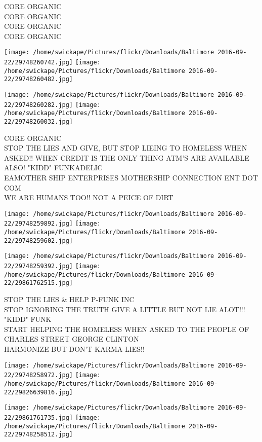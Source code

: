 \documentclass[10pt,letterpaper]{article}
\begin{document}
CORE ORGANIC\\
CORE ORGANIC\\
CORE ORGANIC\\
CORE ORGANIC
\pagebreak

\texttt{[image: /home/swickape/Pictures/flickr/Downloads/Baltimore 2016-09-22/29748260742.jpg]}
\texttt{[image: /home/swickape/Pictures/flickr/Downloads/Baltimore 2016-09-22/29748260482.jpg]}

\texttt{[image: /home/swickape/Pictures/flickr/Downloads/Baltimore 2016-09-22/29748260282.jpg]}
\texttt{[image: /home/swickape/Pictures/flickr/Downloads/Baltimore 2016-09-22/29748260032.jpg]}

CORE ORGANIC\\
STOP THE LIES AND GIVE, BUT STOP LIEING TO HOMELESS WHEN ASKED!! WHEN CREDIT IS THE ONLY THING ATM'S ARE AVAILABLE ALSO! "KIDD" FUNKADELIC\\
EAMOTHER SHIP ENTERPRISES MOTHERSHIP CONNECTION ENT DOT COM\\
WE ARE HUMANS TOO!! NOT A PEICE OF DIRT
\pagebreak

\texttt{[image: /home/swickape/Pictures/flickr/Downloads/Baltimore 2016-09-22/29748259892.jpg]}
\texttt{[image: /home/swickape/Pictures/flickr/Downloads/Baltimore 2016-09-22/29748259602.jpg]}

\texttt{[image: /home/swickape/Pictures/flickr/Downloads/Baltimore 2016-09-22/29748259392.jpg]}
\texttt{[image: /home/swickape/Pictures/flickr/Downloads/Baltimore 2016-09-22/29861762515.jpg]}

STOP THE LIES \& HELP P{-}FUNK INC\\
STOP IGNORING THE TRUTH GIVE A LITTLE BUT NOT LIE ALOT!!! "KIDD" FUNK\\
START HELPING THE HOMELESS WHEN ASKED TO THE PEOPLE OF CHARLES STREET GEORGE CLINTON\\
HARMONIZE BUT DON'T KARMA{-}LIES!!
\pagebreak

\texttt{[image: /home/swickape/Pictures/flickr/Downloads/Baltimore 2016-09-22/29748258972.jpg]}
\texttt{[image: /home/swickape/Pictures/flickr/Downloads/Baltimore 2016-09-22/29826639816.jpg]}

\texttt{[image: /home/swickape/Pictures/flickr/Downloads/Baltimore 2016-09-22/29861761735.jpg]}
\texttt{[image: /home/swickape/Pictures/flickr/Downloads/Baltimore 2016-09-22/29748258512.jpg]}
\end{document}
